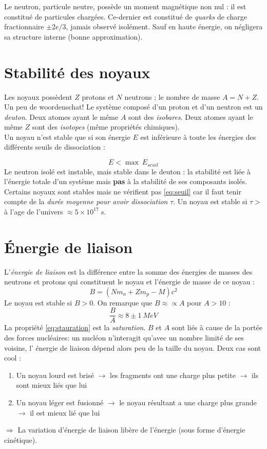 \documentclass[british,french,11pt, a4paper, openany]{book}
\begin{document}
Le neutron, particule neutre, possède un moment magnétique non nul : il est constitué de particules
chargées. Ce-dernier est constitué de \textit{quarks} de charge fractionnaire $\pm 2e/3$, jamais 
observé isolément. Sauf en haute énergie, on négligera sa structure interne (bonne approximation).

\section{Stabilité des noyaux}
Les noyaux possèdent $Z$ protons et $N$ neutrons ; le nombre de masse $A = N + Z$. Un peu de 
woordenschat! Le système composé d'un proton et d'un neutron est un \textit{deuton}. Deux atomes ayant le même 
$A$ sont des \textit{isobares}. Deux atomes ayant le même $Z$ sont des \textit{isotopes} (même 
propriétés chimiques).\\
Un noyau n'est stable que si son énergie $E$ est inférieure à toute les énergies des différents 
seuils de dissociation : 

\begin{equation}
	E < \max\ E_{seuil}
	\label{eq:seuil}
\end{equation}
Le neutron isolé est instable, mais stable dans le deuton : la stabilité est liée à l'énergie 
totale d'un système mais \textbf{pas} à la stabilité de ses composants isolés. \\
Certains noyaux sont stables mais ne vérifient pas \autoref{eq:seuil} car il faut tenir compte 
de la \textit{durée moyenne pour avoir dissociation} $\tau$. Un noyau est stable si $\tau >$ à
l'age de l'univers $\approx 5\times10^{17}\ s$.


\section{Énergie de liaison}
L'\textit{énergie de liaison} est la différence entre la somme des énergies de masses des neutrons 
et protons qui constituent le noyau et l'énergie de masse de ce noyau : 
\begin{equation}
	B = (Nm_n + Zm_p - M)c^2
\end{equation}
Le noyau est stable si $B>0$. On remarque que $B \approx\propto A$ pour $A>10$ :
\begin{equation}
	\frac{B}{A} \approx 8 \pm 1\ MeV
	\label{eq:stauration}
\end{equation}
La propriété \autoref{eq:stauration} est la \textit{saturation}. $B$ et $A$ sont liés à cause de la 
portée des forces nucléaires: un nucléon n’interagit qu'avec un nombre limité de ses voisins, l'
énergie de liaison dépend alors peu de la taille du noyau. Deux cas sont cool :
\begin{enumerate}
	\item Un noyau lourd est brisé $\rightarrow$ les fragments ont une charge plus petite $\rightarrow$ ils
	sont mieux liés que lui
	\item Un noyau léger est fusionné $\rightarrow$ le noyau résultant a une charge plus grande$\rightarrow$
	il est mieux lié que lui
\end{enumerate}
$\Rightarrow$ La variation d'énergie de liaison libère de l'énergie (sous forme d'énergie cinétique).
\end{document}
